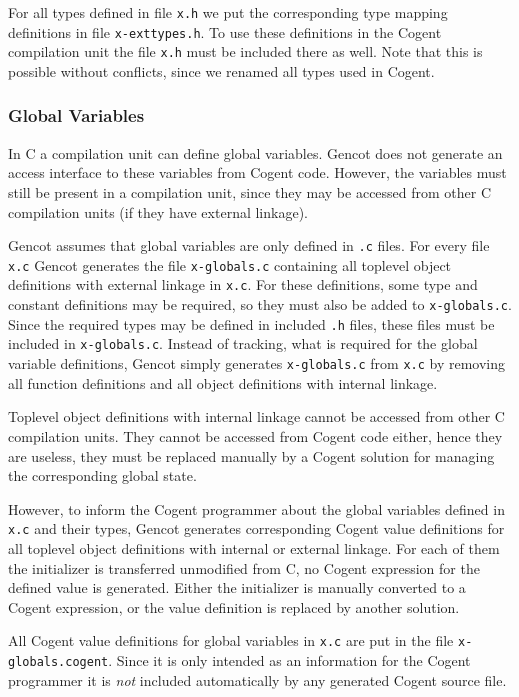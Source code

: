 \documentclass[a4paper]{report}
\newcommand{\code}[1]{\textnormal{\texttt{#1}}}
\begin{document}
For all types defined in file \code{x.h} we put the corresponding type mapping definitions in file \code{x-exttypes.h}. To use
these definitions in the Cogent compilation unit the file \code{x.h} must be included there as well. Note that this is 
possible without conflicts, since we renamed all types used in Cogent.

\subsubsection{Global Variables}

In C a compilation unit can define global variables. Gencot does not generate an access interface to these variables
from Cogent code. However, the variables must still be present in a compilation unit, since they may be accessed
from other C compilation units (if they have external linkage). 

Gencot assumes that global variables are only defined in \code{.c} files. For every file \code{x.c} Gencot generates
the file \code{x-globals.c} containing all toplevel object definitions with external linkage in \code{x.c}. For 
these definitions, some type and constant definitions may be required, so they must also be added to \code{x-globals.c}.
Since the required types may be defined in included \code{.h} files, these files must be included in \code{x-globals.c}.
Instead of tracking, what is required for the global variable definitions, Gencot simply generates \code{x-globals.c}
from \code{x.c} by removing all function definitions and all object definitions with internal linkage.

Toplevel object definitions with internal linkage cannot be accessed from other C compilation units. They cannot be
accessed from Cogent code either, hence they are useless, they must be replaced manually by a Cogent solution for
managing the corresponding global state. 

However, to inform the Cogent programmer about the global variables defined in \code{x.c} and their types, Gencot 
generates corresponding Cogent value definitions for all toplevel object definitions with internal or external linkage. 
For each of them the initializer is transferred unmodified from C, no Cogent expression for the defined value is 
generated. Either the initializer is manually converted to a Cogent expression, or the value definition is replaced
by another solution. 

All Cogent value definitions for global variables in \code{x.c} are put in the file \code{x-globals.cogent}. Since it
is only intended as an information for the Cogent programmer it is \textit{not} included automatically by any generated
Cogent source file.
\end{document}
